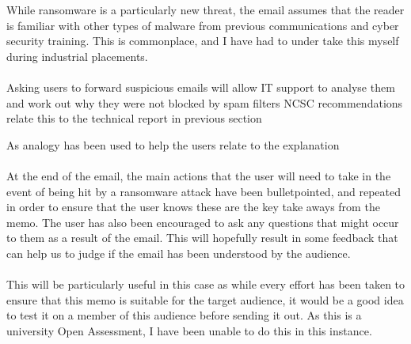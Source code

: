 \documentclass{article}
\begin{document}
While ransomware is a particularly new threat, the email assumes that the reader is familiar with other types of malware from previous communications and cyber security training.
This is commonplace, and I have had to under take this myself during industrial placements.
\\\\
Asking users to forward suspicious emails will allow IT support to analyse them and work out why they were not blocked by spam filters
NCSC recommendations
relate this to the technical report in previous section

As analogy has been used to help the users relate to the explanation
\\\\
At the end of the email, the main actions that the user will need to take in the event of being hit by a ransomware attack have been bulletpointed, and repeated in order to ensure that the user knows these are the key take aways from the memo.
The user has also been encouraged to ask any questions that might occur to them as a result of the email. This will hopefully result in some feedback that can help us to judge if the email has been understood by the audience.
\\\\
This will be particularly useful in this case as while every effort has been taken to ensure that this memo is suitable for the target audience, it would be a good idea to test it on a member of this audience before sending it out. As this is a university Open Assessment, I have been unable to do this in this instance.

\newpage
\raggedright
{}

\end{document}
